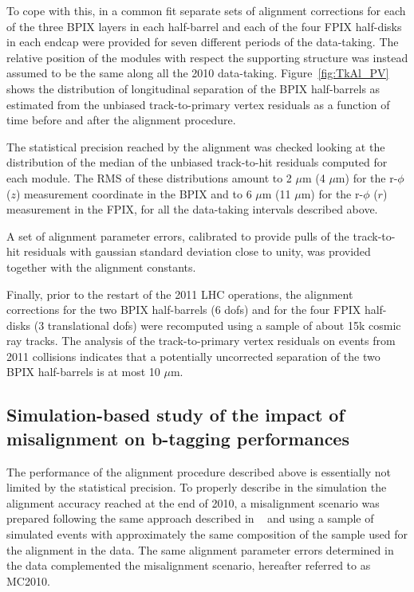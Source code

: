 To cope with this, in a common fit separate sets of alignment corrections for each of
the three BPIX layers in each half-barrel and each of the four FPIX
half-disks in each endcap were provided for seven different periods of
the data-taking. The relative position of the modules with
respect the supporting structure was instead assumed to be the same along all
the 2010 data-taking. 
Figure~\ref{fig:TkAl_PV} shows the distribution of longitudinal separation of the BPIX 
half-barrels as estimated from the unbiased track-to-primary vertex residuals 
as a function of time before and after the alignment procedure. 
 
The statistical precision reached by the alignment was checked looking at the
distribution of the median of the unbiased track-to-hit residuals
computed for each module. 
The RMS of these distributions amount to 2 $\mu$m (4 $\mu$m) for the r-$\phi$ ($z$) measurement
coordinate in the BPIX and to 6 $\mu$m (11 $\mu$m) for the r-$\phi$
($r$) measurement in the FPIX, for all the data-taking intervals described above.

A set of alignment parameter errors, calibrated to provide pulls of
the track-to-hit residuals with gaussian standard deviation close to
unity, was provided together with the alignment
constants.

Finally, prior to the restart of the 2011 LHC operations, the alignment
corrections for the two BPIX half-barrels (6 dofs) and for the four FPIX half-disks
(3 translational dofs) were recomputed using a sample of about 15k cosmic ray
tracks.
The analysis of the track-to-primary vertex residuals on events from
2011 collisions indicates that a potentially uncorrected separation of
the two BPIX half-barrels is at most 10 $\mu$m.


\subsection{Simulation-based study of the impact of misalignment on
  b-tagging performances}

The performance of the alignment procedure described above is
essentially not limited by the statistical precision.
To properly describe in the simulation the alignment
accuracy reached at the end of 2010, a misalignment scenario was
prepared following the same approach described in ~\cite{TkAl_CRAFT08}
and using a sample of simulated events with approximately the
same composition of the sample used for the alignment in the data. 
The same alignment parameter errors determined in the data
complemented the misalignment scenario, hereafter referred to as MC2010.

